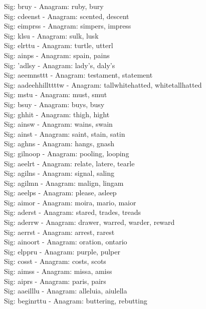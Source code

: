 Sig: {bruy} - Anagram: ruby, bury \\
Sig: {cdeenst} - Anagram: scented, descent \\
Sig: {eimprss} - Anagram: simpers, impress \\
Sig: {klsu} - Anagram: sulk, lusk \\
Sig: {elrttu} - Anagram: turtle, utterl \\
Sig: {ainps} - Anagram: spain, pains \\
Sig: {'adlsy} - Anagram: lady's, daly's \\
Sig: {aeemnsttt} - Anagram: testament, statement \\
Sig: {aadeehhillttttw} - Anagram: tallwhitehatted, whitetallhatted \\
Sig: {mstu} - Anagram: must, smut \\
Sig: {bsuy} - Anagram: buys, busy \\
Sig: {ghhit} - Anagram: thigh, hight \\
Sig: {ainsw} - Anagram: wains, swain \\
Sig: {ainst} - Anagram: saint, stain, satin \\
Sig: {aghns} - Anagram: hangs, gnash \\
Sig: {gilnoop} - Anagram: pooling, looping \\
Sig: {aeelrt} - Anagram: relate, latere, tearle \\
Sig: {agilns} - Anagram: signal, saling \\
Sig: {agilmn} - Anagram: malign, lingam \\
Sig: {aeelps} - Anagram: please, asleep \\
Sig: {aimor} - Anagram: moira, mario, maior \\
Sig: {aderst} - Anagram: stared, trades, treads \\
Sig: {aderrw} - Anagram: drawer, warred, warder, reward \\
Sig: {aerrst} - Anagram: arrest, rarest \\
Sig: {ainoort} - Anagram: oration, ontario \\
Sig: {elppru} - Anagram: purple, pulper \\
Sig: {cosst} - Anagram: costs, scots \\
Sig: {aimss} - Anagram: missa, amiss \\
Sig: {aiprs} - Anagram: paris, pairs \\
Sig: {aaeilllu} - Anagram: alleluia, aiulella \\
Sig: {beginrttu} - Anagram: buttering, rebutting \\
